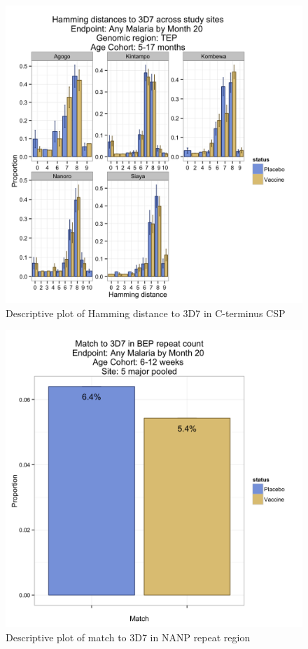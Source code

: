 \documentclass[]{article}
\begin{document}
\begin{figure}[htbp]
\centering
\includegraphics{figures/hamming-infant-sites-x-1.png}
\caption{Descriptive plot of Hamming distance to 3D7 in C-terminus CSP}
\end{figure}

\begin{figure}[htbp]
\centering
\includegraphics{figures/bep-match-newborn-x-1.png}
\caption{Descriptive plot of match to 3D7 in NANP repeat region}
\end{figure}
\end{document}
